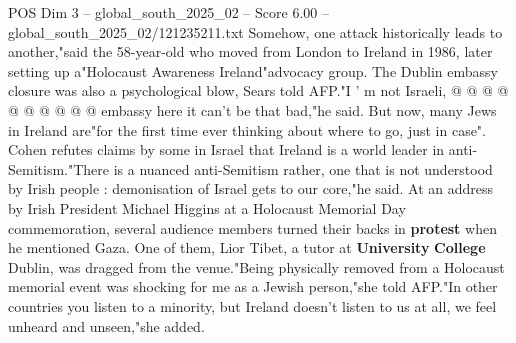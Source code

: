 \begin{textsample}{POS Dim 3 – global\_south\_2025\_02 – Score 6.00 – global\_south\_2025\_02/121235211.txt}
Somehow, one attack historically leads to another,"said the 58-year-old who moved from London to Ireland in 1986, later setting up a"Holocaust Awareness Ireland"advocacy group.
The Dublin embassy closure was also a psychological blow, Sears told AFP."I ' m not Israeli, @ @ @ @ @ @ @ @ @ @ embassy here it can't be that bad,"he said.
But now, many Jews in Ireland are"for the first time ever thinking about where to go, just in case".
Cohen refutes claims by some in Israel that Ireland is a world leader in anti-Semitism."There is a nuanced anti-Semitism rather, one that is not understood by Irish people : demonisation of Israel gets to our core,"he said.
At an address by Irish President Michael Higgins at a Holocaust Memorial Day commemoration, several audience members turned their backs in \textbf{protest} when he mentioned Gaza.
One of them, Lior Tibet, a tutor at \textbf{University} \textbf{College} Dublin, was dragged from the venue."Being physically removed from a Holocaust memorial event was shocking for me as a Jewish person,"she told AFP."In other countries you listen to a minority, but Ireland doesn't listen to us at all, we feel unheard and unseen,"she added.

\end{textsample}
